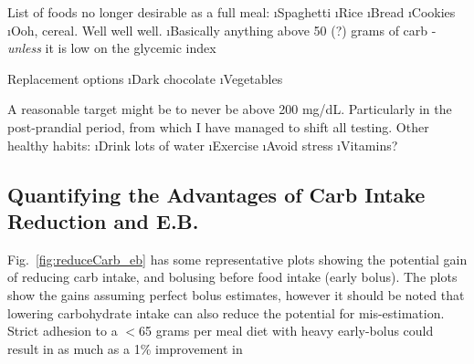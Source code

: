 List of foods no longer desirable as a full meal:
\bi
	\i Spaghetti
	\i Rice
	\i Bread
	\i Cookies
	\i Ooh, cereal. Well well well.
	\i Basically anything above 50 (?) grams of carb - {\it unless} it is low on the glycemic index
\ei

Replacement options
\bi
	\i Dark chocolate
	\i Vegetables
\ei

A reasonable target might be to never be above 200 mg/dL. Particularly in the post-prandial period, from which I have managed to shift all testing. Other healthy habits:
\bi
	\i Drink lots of water
	\i Exercise
	\i Avoid stress
	\i Vitamins?
\ei

\subsection{Quantifying the Advantages of Carb Intake Reduction and E.B.}

Fig.~\ref{fig:reduceCarb_eb} has some representative plots showing the potential gain of reducing carb intake, and bolusing before food intake (early bolus). The plots show the gains assuming perfect bolus estimates, however it should be noted that lowering carbohydrate intake can also reduce the potential for mis-estimation. Strict adhesion to a $<$65 grams per meal diet with heavy early-bolus could result in as much as a 1\% improvement in \hbac

